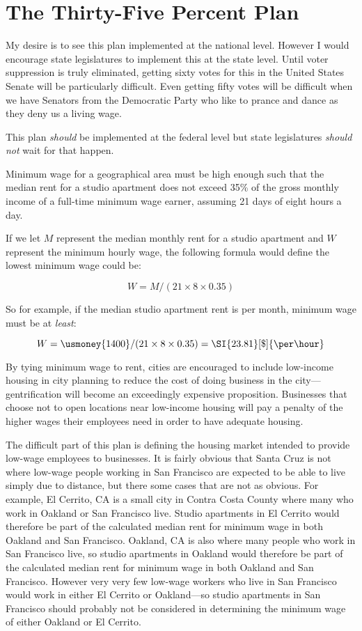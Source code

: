 \section{The Thirty-Five Percent Plan}
\label{thirtyfive}

My desire is to see this plan implemented at the national level. However I would encourage state legislatures to implement this at the state level. Until voter suppression is truly eliminated, getting sixty votes for this in the United States Senate will be particularly difficult. Even getting fifty votes will be difficult when we have Senators from the Democratic Party who like to prance and dance as they deny us a living wage.

This plan \emph{should} be implemented at the federal level but state legislatures \emph{should not} wait for that happen.

Minimum wage for a geographical area must be high enough such that the median rent for a studio apartment does not exceed 35\% of the gross monthly income of a full-time minimum wage earner, assuming 21 days of eight hours a day.

If we let $M$ represent the median monthly rent for a studio apartment and $W$ represent the minimum hourly wage, the following formula would define the lowest minimum wage could be:

\[
W = M / (21 \times 8 \times 0.35)
\]

So for example, if the median studio apartment rent is  per month, minimum wage must be at \emph{least}:

\[
W = \usmoney{1400} / (21 \times 8 \times 0.35) = \SI{23.81}[\$]{\per\hour}
\]

By tying minimum wage to rent, cities are encouraged to include low-income housing in city planning to reduce the cost of doing business in the city---gentrification will become an exceedingly expensive proposition. Businesses that choose not to open locations near low-income housing will pay a penalty of the higher wages their employees need in order to have adequate housing.

The difficult part of this plan is defining the housing market intended to provide low-wage employees to businesses. It is fairly obvious that Santa Cruz is not where low-wage people working in San Francisco are expected to be able to live simply due to distance, but there some cases that are not as obvious. For example, El Cerrito, CA is a small city in Contra Costa County where many who work in Oakland or San Francisco live. Studio apartments in El Cerrito would therefore be part of the calculated median rent for minimum wage in both Oakland and San Francisco. Oakland, CA is also where many people who work in San Francisco live, so studio apartments in Oakland would therefore be part of the calculated median rent for minimum wage in both Oakland and San Francisco. However very very few low-wage workers who live in San Francisco would work in either El Cerrito or Oakland---so studio apartments in San Francisco should probably not be considered in determining the minimum wage of either Oakland or El Cerrito.

